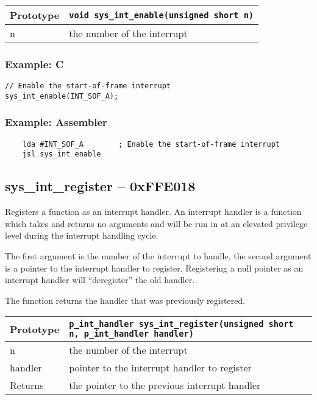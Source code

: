 \bigskip

\begin{tabular}{|l||l|} \hline
Prototype & \lstinline!void sys_int_enable(unsigned short n)! \\ \hline
n & the number of the interrupt \\ \hline
\end{tabular}

\subsubsection*{Example: C}
\begin{lstlisting}
// Enable the start-of-frame interrupt
sys_int_enable(INT_SOF_A);
\end{lstlisting}

\subsubsection*{Example: Assembler}
\begin{verbatim}
    lda #INT_SOF_A        ; Enable the start-of-frame interrupt
    jsl sys_int_enable
\end{verbatim}

\subsection*{sys\_int\_register -- 0xFFE018}
Registers a function as an interrupt handler. An interrupt handler is a function which takes and returns no arguments and will be
run in at an elevated privilege level during the interrupt handling cycle.

The first argument is the number of the interrupt to handle, the second argument is a pointer to the interrupt handler to register.
Registering a null pointer as an interrupt handler will ``deregister'' the old handler.

The function returns the handler that was previously registered.

\begin{tabular}{|l||l|} \hline
Prototype & \lstinline!p_int_handler sys_int_register(unsigned short n, p_int_handler handler)! \\ \hline
n & the number of the interrupt \\ \hline
handler & pointer to the interrupt handler to register \\ \hline
Returns & the pointer to the previous interrupt handler \\ \hline
\end{tabular}

